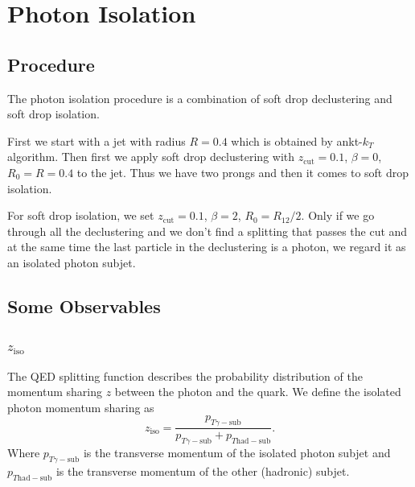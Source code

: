 \documentclass[a4paper, 12pt]{article}
\begin{document}
\section{Photon Isolation}
	\subsection{Procedure}
		The photon isolation procedure is a combination of soft drop declustering and soft drop isolation.\par
		First we start with a jet with radius $R=0.4$ which is obtained by ankt-$k_T$ algorithm. Then first we apply soft drop declustering
		with $z_{\mathrm{cut}}=0.1$, $\beta=0$, $R_0=R=0.4$ to the jet. Thus we have two prongs and then it comes to soft drop isolation.\par
		For soft drop isolation, we set $z_{\mathrm{cut}}=0.1$, $\beta=2$, $R_0=R_{12}/2$. Only if we go through all the declustering and
		we don't find a splitting that passes the cut and at the same time the last particle in the declustering is a photon, we regard
		it as an isolated photon subjet.
	\subsection{Some Observables}
		\subsubsection{$z_{\mathrm{iso}}$}
			The QED splitting function describes the probability distribution of the momentum sharing $z$ between the photon and the
			quark. We define the isolated photon momentum sharing as
			\begin{equation}
				z_{\mathrm{iso}}=\frac{p_{T\gamma-\mathrm{sub}}}{p_{T\gamma-\mathrm{sub}}+p_{T\mathrm{had}-\mathrm{sub}}}.
			\end{equation}
			Where $p_{T\gamma-\mathrm{sub}}$ is the transverse momentum of the isolated photon subjet and $p_{T\mathrm{had}-\mathrm{sub}}$
			is the transverse momentum of the other (hadronic) subjet.
\end{document}
